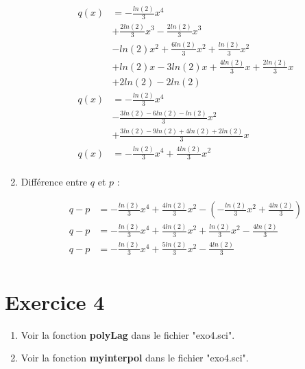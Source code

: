 \documentclass[12pt, letterpaper]{article}
\begin{document}
\begin{enumerate}
  \begin{equation*}
    \begin{split}
      q(x) & = - \frac{ln(2)}{3}x^4 \\
      & + \frac{2ln(2)}{3}x^3 - \frac{2ln(2)}{3}x^3 \\
      & - ln(2)x^2 + \frac{6ln(2)}{3}x^2 + \frac{ln(2)}{3}x^2 \\
      & + ln(2)x - 3ln(2)x + \frac{4ln(2)}{3}x + \frac{2ln(2)}{3}x  \\
      & + 2ln(2) - 2ln(2) \\
      q(x) & = - \frac{ln(2)}{3}x^4 \\
      & - \frac{3ln(2) - 6ln(2) - ln(2)}{3}x^2 \\
      & + \frac{3ln(2) - 9ln(2) + 4ln(2) + 2ln(2)}{3}x  \\
      q(x) & = - \frac{ln(2)}{3}x^4 + \frac{4ln(2)}{3}x^2 \\
    \end{split}
  \end{equation*}

\item Différence entre $q$ et $p$ :

  \begin{equation*}
    \begin{split}
      q - p & = - \frac{ln(2)}{3}x^4 + \frac{4ln(2)}{3}x^2 - (- \frac{
        ln(2)}{3}x^2 + \frac{4ln(2)}{3}) \\
      q - p & = - \frac{ln(2)}{3}x^4 + \frac{4ln(2)}{3}x^2 + \frac{
        ln(2)}{3}x^2 - \frac{4ln(2)}{3} \\
      q - p & = - \frac{ln(2)}{3}x^4 + \frac{5ln(2)}{3}x^2 - \frac{4ln(2)}{3} \\
    \end{split}
  \end{equation*}
  
\end{enumerate}

\section*{Exercice 4}

\begin{enumerate}
\item Voir la fonction \textbf{polyLag} dans le fichier "exo4.sci".
\item Voir la fonction \textbf{myinterpol} dans le fichier "exo4.sci".
\end{enumerate}
\end{document}
